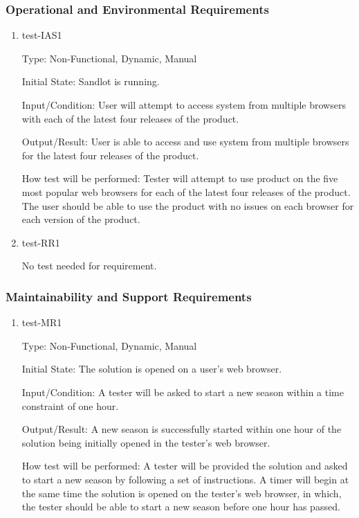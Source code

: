 \documentclass[12pt, titlepage]{article}
\begin{document}
\subsubsection{Operational and Environmental Requirements}

\begin{enumerate}

  \item{test-IAS1\\}

  Type: Non-Functional, Dynamic, Manual

  Initial State: Sandlot is running.

  Input/Condition: User will attempt to access system from multiple 
  browsers with each of the latest four releases of the product.

  Output/Result: User is able to access and use system from multiple
  browsers for the latest four releases of the product.

  How test will be performed: Tester will attempt to use product on
  the five most popular web browsers for each of the latest four 
  releases of the product. The user should be able to use the product
  with no issues on each browser for each version of the product.

  \item{test-RR1\\}

  No test needed for requirement.

\end{enumerate}

\subsubsection{Maintainability and Support Requirements}

\begin{enumerate}

  \item{test-MR1\\}

  Type: Non-Functional, Dynamic, Manual

  Initial State: The solution is opened on a user's web browser.

  Input/Condition: A tester will be asked to start a new season within a time constraint
  of one hour.

  Output/Result: A new season is successfully started within one hour of the solution
  being initially opened in the tester's web browser.

  How test will be performed: A tester will be provided the solution and asked to start
  a new season by following a set of instructions. A timer will begin at the same time
  the solution is opened on the tester's web browser, in which, the tester should be
  able to start a new season before one hour has passed.
  
\end{enumerate}
\end{document}
